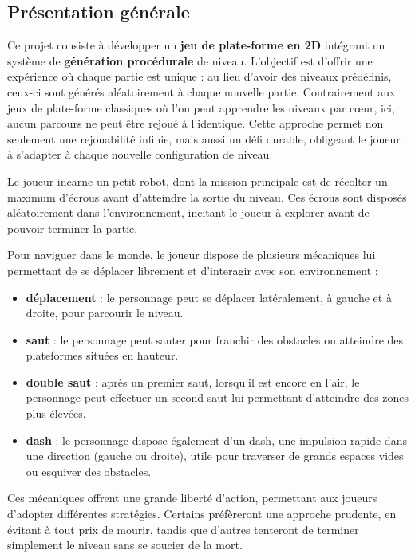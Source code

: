 \documentclass[10pt]{report}
\begin{document}
\subsection{Présentation générale}

Ce projet consiste à développer un \textbf{jeu de plate-forme en 2D} intégrant un système de \textbf{génération procédurale} de niveau.
L’objectif est d’offrir une expérience où chaque partie est unique : au lieu d’avoir des niveaux prédéfinis,
ceux-ci sont générés aléatoirement à chaque nouvelle partie.
Contrairement aux jeux de plate-forme classiques où l'on peut apprendre les niveaux par cœur, ici, aucun parcours ne
peut être rejoué à l’identique.
Cette approche permet non seulement une rejouabilité infinie, mais aussi un défi durable, obligeant le joueur
à s’adapter à chaque nouvelle configuration de niveau.

Le joueur incarne un petit robot, dont la mission principale est de récolter un maximum d’écrous
avant d’atteindre la sortie du niveau.
Ces écrous sont disposés aléatoirement dans l’environnement, incitant le joueur à explorer avant de pouvoir
terminer la partie.

Pour naviguer dans le monde, le joueur dispose de plusieurs mécaniques lui permettant de se déplacer librement et
d’interagir avec son environnement :
\begin{itemize}
  \item \textbf{déplacement} : le personnage peut se déplacer latéralement, à gauche et à droite,
  pour parcourir le niveau.
  \item \textbf{saut} : le personnage peut sauter pour franchir des obstacles ou atteindre des plateformes
  situées en hauteur.
  \item \textbf{double saut} : après un premier saut, lorsqu'il est encore en l’air, le personnage peut effectuer
  un second saut lui permettant d’atteindre des zones plus élevées.
  \item \textbf{dash} : le personnage dispose également d’un dash, une impulsion rapide dans une direction
  (gauche ou droite), utile pour traverser de grands espaces vides ou esquiver des obstacles.\\
\end{itemize}

Ces mécaniques offrent une grande liberté d'action, permettant aux joueurs d’adopter différentes stratégies.
Certains préfèreront une approche prudente, en évitant à tout prix de mourir, tandis que d’autres tenteront de terminer simplement le niveau sans se soucier de la mort.
\end{document}
